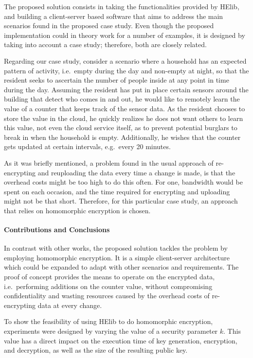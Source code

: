The proposed solution consists in taking the functionalities provided by HElib, and building a client-server based software that aims to address the main scenarios found in the proposed case study. Even though the proposed implementation could in theory work for a number of examples, it is designed by taking into account a case study; therefore, both are closely related.

Regarding our case study, consider a scenario where a household has an expected pattern of activity, i.e.\ empty during the day and non-empty at night, so that the resident seeks to ascertain the number of people inside at any point in time during the day. Assuming the resident has put in place certain sensors around the building that detect who comes in and out, he would like to remotely learn the value of a counter that keeps track of the sensor data. As the resident chooses to store the value in the cloud, he quickly realizes he does not want others to learn this value, not even the cloud service itself, as to prevent potential burglars to break in when the household is empty. Additionally, he wishes that the counter gets updated at certain intervals, e.g.\ every 20 minutes. 

As it was briefly mentioned, a problem found in the usual approach of re-encrypting and reuploading the data every time a change is made, is that the overhead costs might be too high to do this often. For one, bandwidth would be spent on each occasion, and the time required for encrypting and uploading might not be that short. Therefore, for this particular case study, an approach that relies on homomorphic encryption is chosen.

\paragraph{Contributions and Conclusions}
In contrast with other works, the proposed solution tackles the problem by employing homomorphic encryption. It is a simple client-server architecture which could be expanded to adapt with other scenarios and requirements. The proof of concept provides the means to operate on the encrypted data, i.e.\ performing additions on the counter value, without compromising confidentiality and wasting resources caused by the overhead costs of re-encrypting data at every change.

To show the feasibility of using HElib to do homomorphic encryption, experiments were designed by varying the value of a security parameter $k$. This value has a direct impact on the execution time of key generation, encryption, and decryption, as well as the size of the resulting public key.

